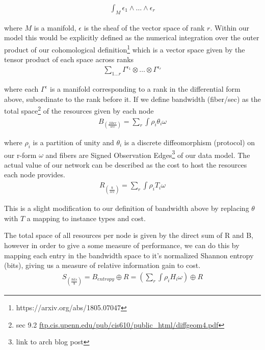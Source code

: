 \documentclass{article}
\begin{document}
\begin{equation*} \label{eq1}
\begin{split}
\int_M \epsilon_1 \wedge \dots \wedge \epsilon_r
\end{split}
\end{equation*}

where $M$ is a manifold, $\epsilon$ is the sheaf of the vector space of rank $r$. Within our model this would be explicitly defined as the numerical integration over the outer product of our cohomological definition\footnote{https://arxiv.org/abs/1805.07047} which is a vector space given by the tensor product of each space across ranks
\begin{equation*} \label{eq1}
\begin{split}
\sum_{1 \dots r} \Gamma^{\epsilon_1} \otimes \dots \otimes \Gamma^{\epsilon_r}
\end{split}
\end{equation*}


where each $\Gamma^{\epsilon}$ is a manifold corresponding to a rank in the differential form above, subordinate to the rank before it. If we define bandwidth (fiber/sec) as the total space\footnote{sec 9.2 \url{ftp.cis.upenn.edu/pub/cis610/public_html/diffgeom4.pdf}} of the resources given by each node
\begin{equation*} \label{eq1}
\begin{split}
B_{(\frac{fiber}{sec})} = \sum_{r} \int \rho_i \theta_i \omega
\end{split}
\end{equation*}

where $\rho_i$ is a partition of unity and $\theta_i$ is a discrete diffeomorphism (protocol) on our r-form $\omega$ and fibers are Signed Observation Edges\footnote{link to arch blog post} of our data model. The actual value of our network can be described as the cost to host the resources each node provides. 
\begin{equation*} \label{eq1}
\begin{split}
R_{(\frac{\$}{sec})} = \sum_{r} \int \rho_i T_i \omega
\end{split}
\end{equation*}

This is a slight modification to our definition of bandwidth above by replacing $\theta$ with $T$ a mapping to instance types and cost.

The total space of all resources per node is given by the direct sum of R and B, however in order to give a some measure of performance, we can do this by mapping each entry in the bandwidth space to it's normalized Shannon entropy (bits), giving us a measure of relative information gain to cost.
\begin{equation*} \label{eq1}
\begin{split}
S_{(\frac{bits}{\$})} = B_{entropy} \oplus R = (\sum_{r} \int \rho_i H_i \omega ) \oplus R
\end{split}
\end{equation*}
\end{document}
